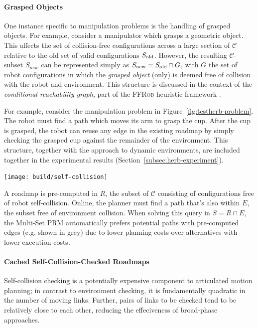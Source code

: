 \paragraph{Grasped Objects}
\label{subsec:grasped-objects}

One instance specific to manipulation problems is the handling of
grasped objects.
For example, 
consider a manipulator which grasps a geometric object.
This affects the set of collision-free configurations
across a large section of $\mathcal{C}$
relative to the old set of valid configurations $S_{\mbox{\scriptsize old}}$.
However,
the resulting $\mathcal{C}$-subset $S_{new}$
can be represented simply as
$S_{\mbox{\scriptsize new}} = S_{\mbox{\scriptsize old}} \cap G$,
with $G$ the set of robot configurations in which
the \emph{grasped object} (only)
is deemed free of collision with the robot and environment.
This structure is discussed in the context of the
\emph{conditional reachability graph},
part of the \textsc{FFRob} heuristic framework
\citep{garrett2014ffrob}.

For example,
consider the manipulation problem in
Figure~\ref{fig:testherb-problem}.
The robot must find a path which moves its arm to grasp the cup.
After the cup is grasped,
the robot can reuse any edge in the existing roadmap
by simply checking the grasped cup
against the remainder of the environment.
This structure,
together with the approach to dynamic environments,
are included together in the experimental results
(Section~\ref{subsec:herb-experiment}).

\begin{marginfigure}
   \centering
   \texttt{[image: build/self-collision]}
   \caption{A roadmap is pre-computed in $R$,
      the subset of $\mathcal{C}$ consisting of configurations free
      of robot self-collision.
      Online, the planner must find a path that's also within $E$,
      the subset free of environment collision.
      When solving this query in $S = R \cap E$,
      the Multi-Set PRM automatically prefers potential paths with
      pre-computed edges (e.g. shown in grey)
      due to lower planning costs over alternatives with lower
      execution costs.}
   \label{fig:self-collision-example}
\end{marginfigure}

\paragraph{Cached Self-Collision-Checked Roadmaps}
\label{subsec:cached-self-valid}

Self-collision checking is a potentially expensive component to
articulated motion planning;
in contrast to environment checking,
it is fundamentally quadratic in the number of moving links.
Further, pairs of links to be checked
tend to be relatively close to each other,
reducing the effeciveness of broad-phase approaches.

